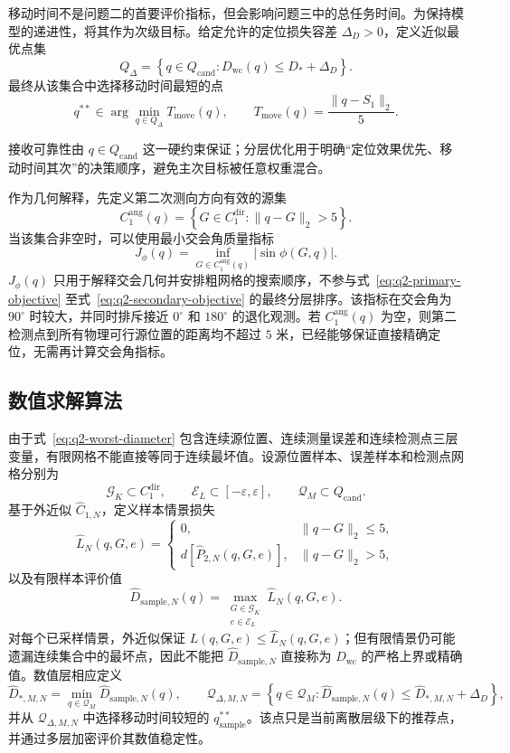 移动时间不是问题二的首要评价指标，但会影响问题三中的总任务时间。为保持模型的递进性，将其作为次级目标。给定允许的定位损失容差 $\Delta_D>0$，定义近似最优点集
\begin{equation}
  Q_\Delta=
  \left\{
  q\in Q_{\mathrm{cand}}:
  D_{\mathrm{wc}}(q)\leq D_*+\Delta_D
  \right\}.
  \label{eq:q2-near-optimal-set}
\end{equation}
最终从该集合中选择移动时间最短的点
\begin{equation}
  q^{**}\in\arg\min_{q\in Q_\Delta}
  T_{\mathrm{move}}(q),
  \qquad
  T_{\mathrm{move}}(q)=\frac{\|q-S_1\|_2}{5}.
  \label{eq:q2-secondary-objective}
\end{equation}

接收可靠性由 $q\in Q_{\mathrm{cand}}$ 这一硬约束保证；分层优化用于明确“定位效果优先、移动时间其次”的决策顺序，避免主次目标被任意权重混合。

作为几何解释，先定义第二次测向方向有效的源集
\[
  C_1^{\mathrm{ang}}(q)
  =\left\{G\in C_1^{\mathrm{dir}}:\|q-G\|_2>5\right\}.
\]
当该集合非空时，可以使用最小交会角质量指标
\begin{equation}
  J_\phi(q)=\inf_{G\in C_1^{\mathrm{ang}}(q)}|\sin\phi(G,q)|.
  \label{eq:q2-angle-quality}
\end{equation}
$J_\phi(q)$ 只用于解释交会几何并安排粗网格的搜索顺序，不参与式~\eqref{eq:q2-primary-objective} 至式~\eqref{eq:q2-secondary-objective} 的最终分层排序。该指标在交会角为 $90^\circ$ 时较大，并同时排斥接近 $0^\circ$ 和 $180^\circ$ 的退化观测。若 $C_1^{\mathrm{ang}}(q)$ 为空，则第二检测点到所有物理可行源位置的距离均不超过 $5$ 米，已经能够保证直接精确定位，无需再计算交会角指标。

\subsection{数值求解算法}

由于式~\eqref{eq:q2-worst-diameter} 包含连续源位置、连续测量误差和连续检测点三层变量，有限网格不能直接等同于连续最坏值。设源位置样本、误差样本和检测点网格分别为
\[
  \mathcal G_K\subset C_1^{\mathrm{dir}},
  \qquad
  \mathcal E_L\subset[-\varepsilon,\varepsilon],
  \qquad
  \mathcal Q_M\subset Q_{\mathrm{cand}}.
\]
基于外近似 $\widehat C_{1,N}$，定义样本情景损失
\[
  \widehat L_N(q,G,e)=
  \begin{cases}
    0, & \|q-G\|_2\leq5,\\
    d\left[\widehat P_{2,N}(q,G,e)\right], & \|q-G\|_2>5,
  \end{cases}
\]
以及有限样本评价值
\[
  \widehat D_{\mathrm{sample},N}(q)
  =\max_{\substack{G\in\mathcal G_K\\e\in\mathcal E_L}}
  \widehat L_N(q,G,e).
\]
对每个已采样情景，外近似保证 $L(q,G,e)\leq\widehat L_N(q,G,e)$；但有限情景仍可能遗漏连续集合中的最坏点，因此不能把 $\widehat D_{\mathrm{sample},N}$ 直接称为 $D_{\mathrm{wc}}$ 的严格上界或精确值。数值层相应定义
\[
  \widehat D_{*,M,N}
  =\min_{q\in\mathcal Q_M}\widehat D_{\mathrm{sample},N}(q),
  \qquad
  \mathcal Q_{\Delta,M,N}
  =\left\{q\in\mathcal Q_M:
  \widehat D_{\mathrm{sample},N}(q)
  \leq\widehat D_{*,M,N}+\Delta_D\right\},
\]
并从 $\mathcal Q_{\Delta,M,N}$ 中选择移动时间较短的 $q_{\mathrm{sample}}^{**}$。该点只是当前离散层级下的推荐点，并通过多层加密评价其数值稳定性。

